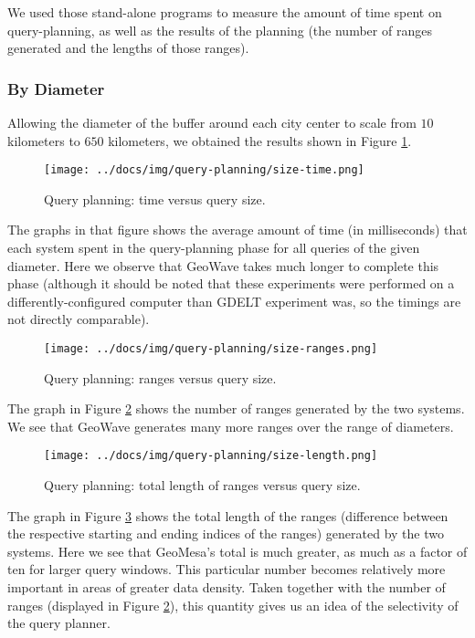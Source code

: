 We used those stand-alone programs to measure the amount of time spent on query-planning, as well as the results of the planning (the number of ranges generated and the lengths of those ranges).

\subsubsection{By Diameter}

Allowing the diameter of the buffer around each city center to scale from $10$ kilometers to $650$ kilometers,
we obtained the results shown in Figure \ref{planningsizetime}.

\begin{figure}[h!tb]
  \centering
  \texttt{[image: ../docs/img/query-planning/size-time.png]}
  \caption{Query planning: time versus query size.}
  \label{planningsizetime}
\end{figure}

The graphs in that figure shows the average amount of time (in milliseconds) that each system spent in the query-planning phase for all queries of the given diameter.
Here we observe that GeoWave takes much longer to complete this phase (although it should be noted that these experiments were performed on a differently-configured computer than GDELT experiment was, so the timings are not directly comparable).

\begin{figure}[h!tb]
  \centering
  \texttt{[image: ../docs/img/query-planning/size-ranges.png]}
  \caption{Query planning: ranges versus query size.}
  \label{planningsizeranges}
\end{figure}

The graph in Figure \ref{planningsizeranges} shows the number of ranges generated by the two systems.
We see that GeoWave generates many more ranges over the range of diameters.

\begin{figure}[h!tb]
  \centering
  \texttt{[image: ../docs/img/query-planning/size-length.png]}
  \caption{Query planning: total length of ranges versus query size.}
  \label{planningsizelength}
\end{figure}

The graph in Figure \ref{planningsizelength} shows the total length of the ranges (difference between the respective starting and ending indices of the ranges) generated by the two systems.
Here we see that GeoMesa's total is much greater, as much as a factor of ten for larger query windows.
This particular number becomes relatively more important in areas of greater data density.
Taken together with the number of ranges (displayed in Figure \ref{planningsizeranges}), this quantity gives us an idea of the selectivity of the query planner.


